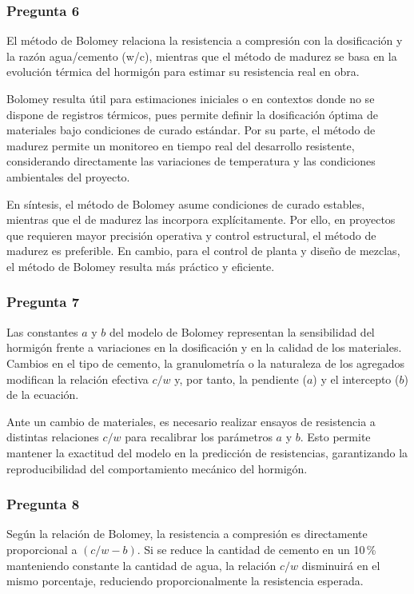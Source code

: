\subsubsection*{Pregunta 6} 

El método de Bolomey relaciona la resistencia a compresión con la dosificación y la razón agua/cemento (w/c), mientras que el método de madurez se basa en la evolución térmica del hormigón para estimar su resistencia real en obra.  

Bolomey resulta útil para estimaciones iniciales o en contextos donde no se dispone de registros térmicos, pues permite definir la dosificación óptima de materiales bajo condiciones de curado estándar.  
Por su parte, el método de madurez permite un monitoreo en tiempo real del desarrollo resistente, considerando directamente las variaciones de temperatura y las condiciones ambientales del proyecto.

En síntesis, el método de Bolomey asume condiciones de curado estables, mientras que el de madurez las incorpora explícitamente.  
Por ello, en proyectos que requieren mayor precisión operativa y control estructural, el método de madurez es preferible. En cambio, para el control de planta y diseño de mezclas, el método de Bolomey resulta más práctico y eficiente.


\subsubsection*{Pregunta 7} 

Las constantes \(a\) y \(b\) del modelo de Bolomey representan la sensibilidad del hormigón frente a variaciones en la dosificación y en la calidad de los materiales.  
Cambios en el tipo de cemento, la granulometría o la naturaleza de los agregados modifican la relación efectiva \(c/w\) y, por tanto, la pendiente (\(a\)) y el intercepto (\(b\)) de la ecuación.

Ante un cambio de materiales, es necesario realizar ensayos de resistencia a distintas relaciones \(c/w\) para recalibrar los parámetros \(a\) y \(b\).  
Esto permite mantener la exactitud del modelo en la predicción de resistencias, garantizando la reproducibilidad del comportamiento mecánico del hormigón.


\subsubsection*{Pregunta 8} 

Según la relación de Bolomey, la resistencia a compresión es directamente proporcional a \((c/w - b)\).  
Si se reduce la cantidad de cemento en un 10\,\% manteniendo constante la cantidad de agua, la relación \(c/w\) disminuirá en el mismo porcentaje, reduciendo proporcionalmente la resistencia esperada.  

